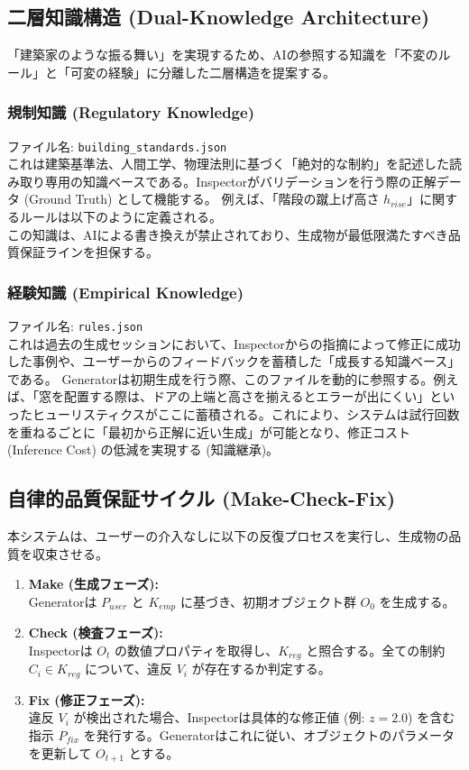 \documentclass{deimj}
\begin{document}
\subsection{二層知識構造 (Dual-Knowledge Architecture)}
「建築家のような振る舞い」を実現するため、AIの参照する知識を「不変のルール」と「可変の経験」に分離した二層構造を提案する。

\subsubsection{規制知識 (Regulatory Knowledge)}
ファイル名: \texttt{building\_standards.json}\\
これは建築基準法、人間工学、物理法則に基づく「絶対的な制約」を記述した読み取り専用の知識ベースである。Inspectorがバリデーションを行う際の正解データ (Ground Truth) として機能する。
例えば、「階段の蹴上げ高さ $h_{rise}$」に関するルールは以下のように定義される。
\begin{equation}
\end{equation}
この知識は、AIによる書き換えが禁止されており、生成物が最低限満たすべき品質保証ラインを担保する。

\subsubsection{経験知識 (Empirical Knowledge)}
ファイル名: \texttt{rules.json}\\
これは過去の生成セッションにおいて、Inspectorからの指摘によって修正に成功した事例や、ユーザーからのフィードバックを蓄積した「成長する知識ベース」である。
Generatorは初期生成を行う際、このファイルを動的に参照する。例えば、「窓を配置する際は、ドアの上端と高さを揃えるとエラーが出にくい」といったヒューリスティクスがここに蓄積される。これにより、システムは試行回数を重ねるごとに「最初から正解に近い生成」が可能となり、修正コスト (Inference Cost) の低減を実現する (知識継承)。

\subsection{自律的品質保証サイクル (Make-Check-Fix)}
本システムは、ユーザーの介入なしに以下の反復プロセスを実行し、生成物の品質を収束させる。

\begin{enumerate}
 \item \textbf{Make (生成フェーズ):}\\
 Generatorは $P_{user}$ と $K_{emp}$ に基づき、初期オブジェクト群 $O_0$ を生成する。
 \item \textbf{Check (検査フェーズ):}\\
 Inspectorは $O_t$ の数値プロパティを取得し、$K_{reg}$ と照合する。全ての制約 $C_i \in K_{reg}$ について、違反 $V_i$ が存在するか判定する。
 \item \textbf{Fix (修正フェーズ):}\\
 違反 $V_i$ が検出された場合、Inspectorは具体的な修正値 (例: $z=2.0$) を含む指示 $P_{fix}$ を発行する。Generatorはこれに従い、オブジェクトのパラメータを更新して $O_{t+1}$ とする。
\end{enumerate}
\end{document}

